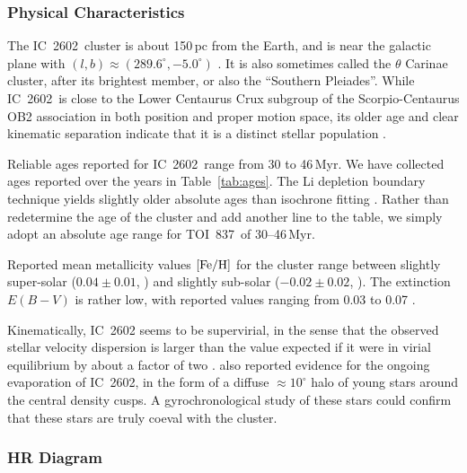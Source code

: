 \documentclass[12pt,twocolumn,tighten]{aastex63}
\newcommand{\tn}{TOI~837} %
\newcommand{\cn}{IC~2602} %
\begin{document}


\subsubsection{Physical Characteristics}
\label{subsec:clusterchar}

The \cn\ cluster is about 150$\,$pc from the Earth, and is near the
galactic plane with $(l,b)\approx(289.6^\circ, -5.0^\circ)$
\citep{cantatgaudin_gaia_2018}.  It is also sometimes called the
$\theta$ Carinae cluster, after its brightest member, or also the
``Southern Pleiades''.  While \cn\ is close to the Lower Centaurus
Crux subgroup of the Scorpio-Centaurus OB2 association in both
position and proper motion space, its older age and clear kinematic
separation indicate that it is a distinct stellar population
\citep{de_zeeuw_hipparcos_1999,damiani_stellar_2019}.

Reliable ages reported for \cn\ range from 30 to 46$\,$Myr.  We have
collected ages reported over the years in Table~\ref{tab:ages}.  The
Li depletion boundary technique yields slightly older absolute ages
than isochrone fitting \citep{dobbie_ic_2010,randich_gaiaeso_2018}.
Rather than redetermine the age of the cluster and add another line to
the table, we simply adopt an absolute age range for \tn\ of
30--46$\,$Myr.

Reported mean metallicity values ${\rm [Fe/H]}$ for the cluster range
between slightly super-solar ($0.04\pm0.01$,
\citealt{baratella_gaia-eso_2020}) and slightly sub-solar ($-0.02 \pm
0.02$, \citealt{netopil_metallicity_2016}).  The extinction $E(B-V)$
is rather low, with reported values ranging from 0.03 to 0.07
\citep[{\it e.g.},][]{randich_gaiaeso_2018}.

Kinematically, IC~2602 seems to be supervirial, in the sense that the
observed stellar velocity dispersion is larger than the value expected
if it were in virial equilibrium by about a factor of two
\citep{bravi_gaia-eso_2018}.  \citet{damiani_stellar_2019} also
reported evidence for the ongoing evaporation of \cn, in the form of a
diffuse $\approx10^\circ$ halo of young stars around the central
density cusps.  A gyrochronological study of these stars could confirm
that these stars are truly coeval with the cluster.


\subsubsection{HR Diagram}
\label{subsec:hr}
\end{document}

